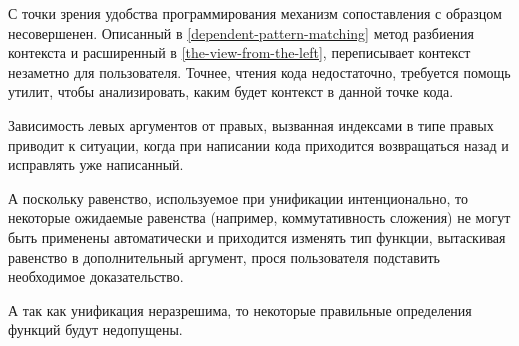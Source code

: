 С точки зрения удобства программирования механизм сопоставления с образцом
несовершенен. Описанный в \ref{dependent-pattern-matching} метод разбиения
контекста и расширенный в \ref{the-view-from-the-left}, переписывает контекст
незаметно для пользователя. Точнее, чтения кода недостаточно, требуется помощь
утилит, чтобы анализировать, каким будет контекст в данной точке кода.

Зависимость левых аргументов от правых, вызванная индексами в типе правых приводит
к ситуации, когда при написании кода приходится возвращаться назад и исправлять
уже написанный.

А поскольку равенство, используемое при унификации интенционально, то некоторые
ожидаемые равенства (например, коммутативность сложения) не могут быть применены
автоматически и приходится изменять тип функции, вытаскивая равенство в дополнительный
аргумент, прося пользователя подставить необходимое доказательство.

А так как унификация неразрешима, то некоторые правильные определения функций
будут недопущены.
